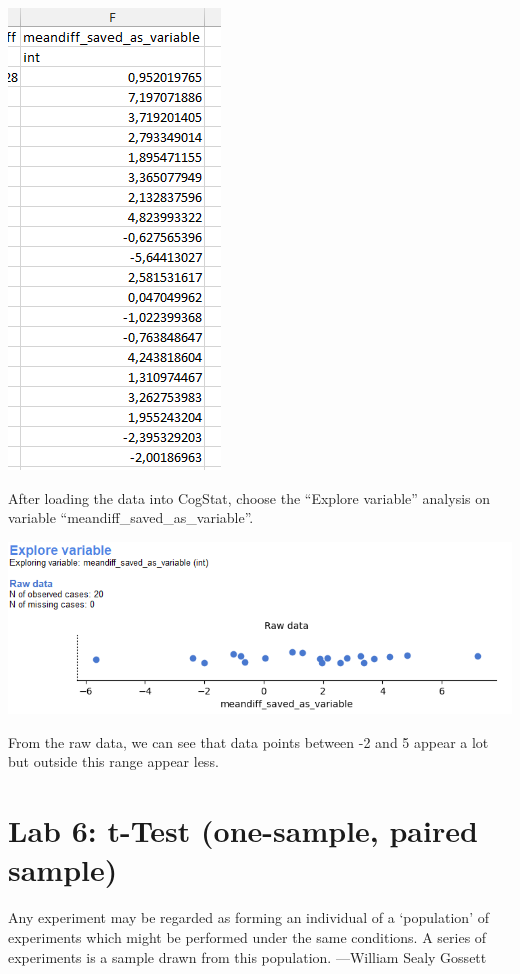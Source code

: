 \documentclass[
]{book}
\begin{document}
\includegraphics{img/ch5/5.4meandiffvariable.png}

After loading the data into CogStat, choose the ``Explore variable'' analysis on variable ``meandiff\_saved\_as\_variable''.

\includegraphics{img/ch5/5.4rawdata.png}

From the raw data, we can see that data points between -2 and 5 appear a lot but outside this range appear less.

\hypertarget{lab-6-t-test-one-sample-paired-sample}{%
\chapter{Lab 6: t-Test (one-sample, paired sample)}\label{lab-6-t-test-one-sample-paired-sample}}

{
Any experiment may be regarded as forming an individual of a `population' of experiments which might be performed under the same conditions. A series of experiments is a sample drawn from this population.
---William Sealy Gossett
}
\end{document}
